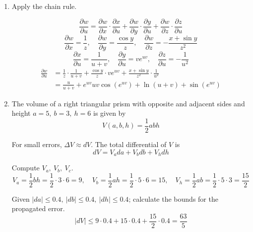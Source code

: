 \documentclass[a4paper, 12pt]{article}
\begin{document}
\begin{enumerate}[leftmargin=*,label=\textbf{\arabic*.}]
Let $\delta=\epsilon/3$.
\[\left|\frac{4x^2-y}{2x+y}-4\right|\leq2|x-1|+|y+2|\leq3\cdot\frac\epsilon3=\epsilon\]

Since the limit is equal to the value of the function at $(-1,2)$, $\boxed{\text{$f$ is continuous}}$ at $(-1,2)$.

\item Apply the chain rule.

\[\frac{\partial w}{\partial u}=\frac{\partial w}{\partial x}\cdot\frac{\partial x}{\partial u}+\frac{\partial w}{\partial y}\cdot\frac{\partial y}{\partial u}+\frac{\partial w}{\partial z}\cdot\frac{\partial z}{\partial u}\]
\[\frac{\partial w}{\partial x}=\frac1z,\quad\frac{\partial w}{\partial y}=\frac{\cos y}z,\quad \frac{\partial w}{\partial z}=-\frac{x+\sin y}{z^2}\]
\[\frac{\partial x}{\partial u}=\frac1{u+v},\quad\frac{\partial y}{\partial u}=v{e}^{uv},\quad\frac{\partial z}{\partial u}=-\frac1{u^2}\]
\begin{align*}\frac{\partial w}{\partial u}&=\frac1z\cdot\frac1{u+v}+\frac{\cos y}z\cdot v{e}^{uv}+\frac{x+\sin y}{z^2}\cdot\frac1{u^2}\\[1em]&=\boxed{\frac u{u+v}+{e}^{uv}uv\cos\left({e}^{uv}\right)+\ln(u+v)+\sin\left({e}^{uv}\right)}\end{align*}

\item The volume of a right triangular prism with opposite and adjacent sides and height $a=5,\:b=3,\:h=6$ is given by
\[V(a,b,h)=\frac12 abh\]

For small errors, $\Delta V\approx dV$. The total differential of $V$ is
\[dV=V_ada+V_bdb+V_hdh\]

Compute $V_a,\: V_b,\: V_c$.
\[V_a=\frac12bh=\frac12\cdot3\cdot6=9,\quad V_b=\frac12ah=\frac12\cdot5\cdot6=15,\quad V_h=\frac12ab=\frac12\cdot5\cdot3=\frac{15}2\]

Given $|da|\leq0.4,\:|db|\leq0.4,\:|dh|\leq0.4$; calculate the bounds for the propagated error.
\[\left|dV\right|\leq9\cdot0.4+15\cdot0.4+\frac{15}2\cdot0.4=\boxed{\frac{63}5}\]


\end{enumerate}
\end{document}
